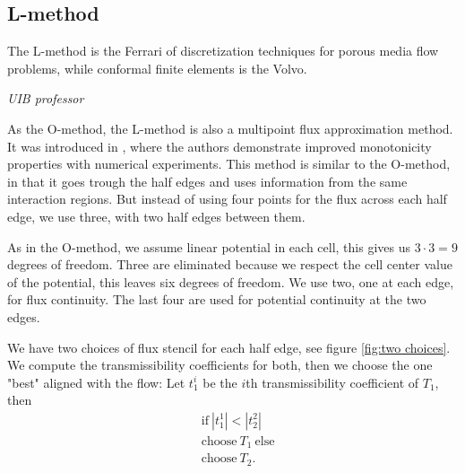\documentclass[../Main/main.tex]{subfiles}
\begin{document}
	\subsection*{L-method}
	\epigraph{The L-method is the Ferrari of discretization techniques for porous media flow problems, while conformal finite elements is the Volvo.}{\textit{UIB professor}}
	As the O-method, the L-method is also a multipoint flux approximation method. It was introduced in \cite{https://doi.org/10.1002/num.20320}, where the authors demonstrate improved monotonicity properties with numerical experiments. This method is similar to the O-method, in that it goes trough the half edges and uses information from the same interaction regions. But instead of using four points for the flux across each half edge, we use three, with two half edges between them. \par
	As in the O-method, we assume linear potential in each cell, this gives us $3\cdot 3 = 9$ degrees of freedom. Three are eliminated because we respect the cell center value of the potential, this leaves six degrees of freedom. We use two, one at each edge, for flux continuity. The last four are used for potential continuity at the two edges. 
	\par
	We have two choices of flux stencil for each half edge, see figure \ref{fig:two choices}. We compute the transmissibility coefficients for both, then we choose the one "best" aligned with the flow: Let $t_1^i$ be the $i$th transmissibility coefficient of $T_1$, then
	\begin{equation}\label{eq:L-criterion}
		\begin{aligned}
			&\text{if} \ |t^1_1| < |t^2_2| \\
			&\text{choose} \ T_1 \ \text{else} \\
			&\text{choose} \ T_2.
		\end{aligned}
	\end{equation}
\end{document}
